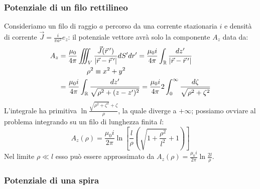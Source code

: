 \subsubsection{Potenziale di un filo rettilineo}

Consideriamo un filo di raggio $ a $ percorso da una corrente stazionaria $ i $ e densità di corrente $ \vec{J} = \frac{i}{\pi a^2} \hat{e}_z $: il potenziale vettore avrà solo la componente $ A_z $ data da:
\begin{equation}
	\begin{split}
		A_z &= \displaystyle\frac{\mu_0}{4\pi} \iiint_V \displaystyle\frac{\vec{J}(\vec{r}\,')}{\left\lvert\vec{r} - \vec{r}\,'\right\rvert} dS' dr' = \displaystyle\frac{\mu_0 i}{4\pi} \int_{\mathbb{R}} \displaystyle\frac{dz'}{\left\lvert\vec{r} - \vec{r}\,'\right\rvert} \\ 
		    & \qquad\qquad \rho^2 \equiv x^2 + y^2 \\ 
		    &= \displaystyle\frac{\mu_0 i}{4\pi} \int_{\mathbb{R}} \displaystyle\frac{dz'}{\sqrt{\rho^2 + (z - z')^2}} = \displaystyle\frac{\mu_0 i}{4\pi} 2\int_0^{\infty} \displaystyle\frac{d\zeta}{\sqrt{\rho^2 + \zeta^2}}
	\end{split}
	\label{eq:pot-filo-rett}
\end{equation}
L'integrale ha primitiva $ \ln{\frac{\sqrt{\rho^2 + \zeta^2} + \zeta}{\rho}} $, la quale diverge a $ +\infty $; possiamo ovviare al problema integrando su un filo di lunghezza finita $ l $:
\begin{equation}
	A_z (\rho) = \displaystyle\frac{\mu_0 i}{2\pi} \ln\left[ \displaystyle\frac{l}{\rho} \left( \sqrt{1 + \displaystyle\frac{\rho^2}{l^2}} + 1 \right) \right]
	\label{eq:pot-filo-rett-fin}
\end{equation}
Nel limite $ \rho \ll l $ esso può essere approssimato da $ A_z (\rho) = \displaystyle\frac{\mu_0 i}{2\pi} \ln{\frac{2l}{\rho}} $.

\subsubsection{Potenziale di una spira}

